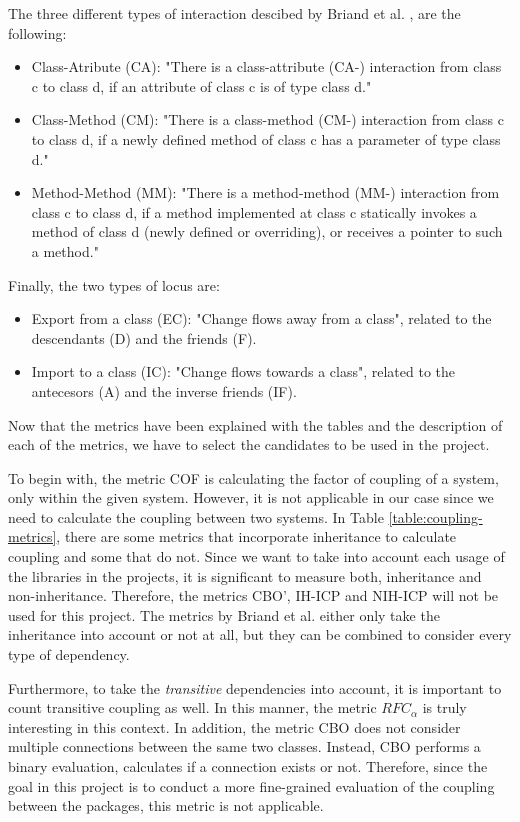 \bigskip\noindent
The three different types of interaction descibed by Briand et al. \cite{briand1997investigation}, are the following:
\begin{itemize}
    \item Class-Atribute (CA): "There is a class-attribute (CA-) interaction from class c to class d, if an attribute of class c is of type class d."
    \item Class-Method (CM): "There is a class-method (CM-) interaction from class c to class d, if a newly defined method of class c has a parameter of type class d."
    \item Method-Method (MM): "There is a method-method (MM-) interaction from class c to class d, if a method implemented at class c statically invokes a method of class d (newly defined or overriding), or receives a pointer to such a method."
\end{itemize}

\bigskip\noindent
Finally, the two types of locus are:
\begin{itemize}
  \item Export from a class (EC): "Change flows away from a class", related to the descendants (D) and the friends (F).
  \item Import to a class (IC): "Change flows towards a class", related to the antecesors (A) and the inverse friends (IF).
\end{itemize}

\bigskip\noindent
Now that the metrics have been explained with the tables and the description of each of the metrics, we have to select the candidates to be used in the project.

To begin with, the metric COF is calculating the factor of coupling of a system, only within the given system. However, it is not applicable in our case since we need to calculate the coupling between two systems.
In Table \ref{table:coupling-metrics}, there are some metrics that incorporate inheritance to calculate coupling and some that do not.
Since we want to take into account each usage of the libraries in the projects, it is significant to measure both, inheritance and non-inheritance.
Therefore, the metrics CBO', IH-ICP and NIH-ICP will not be used for this project. The metrics by Briand et al. either only take the inheritance into account or not at all, but they can be combined to consider every type of dependency.

Furthermore, to take the \textit{transitive} dependencies into account, it is important to count transitive coupling as well.
In this manner, the metric $RFC_\alpha$ is truly interesting in this context.
In addition, the metric CBO does not consider multiple connections between the same two classes. Instead, CBO performs a binary evaluation, calculates if a connection exists or not. Therefore, since the goal in this project is to conduct a more fine-grained evaluation of the coupling between the packages, this metric is not applicable.

